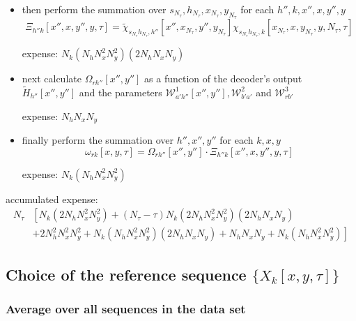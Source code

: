 \documentclass[10pt,a4paper]{article}
\begin{document}
\begin{itemize}
\begin{itemize}
\item then perform the summation over $s_{N_\tau}, h_{N_\tau}, x_{N_\tau}, y_{N_\tau}$ for each $h'', k, x'', x, y'', y$
$$\Xi_{h''k}[x'', x, y'', y, \tau] = \tilde{\chi}_{s_{N_\tau}h_{N_\tau}, h''}[x'', x_{N_\tau}, y'', y_{N_\tau}] \chi_{s_{N_\tau} h_{N_\tau},k}[x_{N_\tau}, x, y_{N_\tau}, y, N_\tau, \tau] $$
\begin{tcolorbox} expense: $N_k (N_h N_x^2 N_y^2) (2 N_h N_x N_y)$ \end{tcolorbox}
\item next calculate $\Omega_{r h''}[x'',y'']$ as a function of the decoder's output $\tilde{H}_{h''}[x'',y'']$ and the parameters $\mathcal{W}^{1}_{a'h''}[x'', y''], \mathcal{W}^{2}_{b'a'}$ and $ \mathcal{W}^{3}_{rb'}$
\begin{tcolorbox} expense: $N_h N_x N_y$ \end{tcolorbox}
\item finally perform the summation over $h'', x'', y''$ for each $k,x,y$
$$ \omega_{rk}[x,y,\tau] = \Omega_{r h''}[x'',y''] \cdot \Xi_{h''k}[x'', x, y'', y, \tau] $$
\begin{tcolorbox} expense: $N_k (N_h N^2_x N^2_y)$ \end{tcolorbox}

\end{itemize}

\begin{tcolorbox}
accumulated expense: 
\begin{align}
 N_\tau & \left[ N_k (2 N_h N_x^2 N_y^2) +(N_\tau - \tau) N_k (2 N_h N_x^2 N_y^2) (2 N_h N_x N_y) \right. \nonumber \\ 
 & \left.  + 2 N_h^2 N_x^2 N_y^2 + N_k (N_h N_x^2 N_y^2) (2 N_h N_x N_y) + N_h N_x N_y + N_k (N_h N^2_x N^2_y) \right]
\end{align}
\end{tcolorbox}
\end{itemize}

\subsection{Choice of the reference sequence $\{X_k[x,y,\tau]\}$}

\subsubsection{Average over all sequences in the data set}
\end{document}

